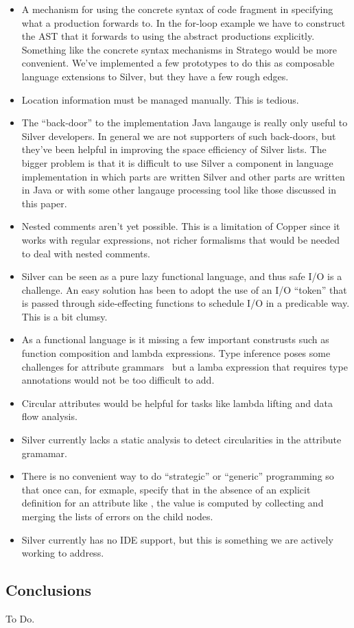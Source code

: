 \begin{itemize}
\item A mechanism for using the concrete syntax of code fragment in
  specifying what a production forwards to.  In the for-loop example
  we have to construct the AST that it forwards to using the abstract
  productions explicitly.   Something like the concrete syntax
  mechanisms in Stratego would be more convenient.   We've implemented a few
  prototypes to do this as composable language extensions to Silver,
  but they have a few rough edges.

\item Location information must be managed manually. This is tedious.
\item The ``back-door'' to the implementation Java langauge is really
  only useful to Silver developers.  In general we are not supporters
  of such back-doors, but they've been helpful in improving the space
  efficiency of Silver lists.  The bigger problem is that it is
  difficult to use Silver a component in language implementation in
  which parts are written Silver and other parts are written in Java
  or with some other langauge processing tool like those discussed in
  this paper.

\item Nested comments aren't yet possible.  This is a limitation of
  Copper since it works with regular expressions, not richer
  formalisms that would be needed to deal with nested comments.  

\item Silver can be seen as a pure lazy functional language, and thus
  safe I/O is a challenge.  An easy solution has been to adopt the use
  of an I/O ``token'' that is passed through side-effecting functions
  to schedule I/O in a predicable way.  This is a bit clumsy.

\item As a functional language is it missing a few important
  construsts such as function composition and lambda expressions.
  Type inference poses some challenges for attribute
  grammars~\cite{kaminski11sle} but a lamba expression that requires
  type annotations would not be too difficult to add.

\item Circular attributes would be helpful for tasks like lambda
  lifting and data flow analysis.
\item Silver currently lacks a static analysis to detect circularities
  in the attribute gramamar.
\item There is no convenient way to do ``strategic'' or ``generic''
  programming so that once can, for exmaple, specify that in the
  absence of an explicit definition for an attribute like
  , the value is computed by collecting and merging the
  lists of errors on the child nodes.
\item Silver currently has no IDE support, but this is something we
  are actively working to address.
\end{itemize}

\subsection{Conclusions}\label{silver:sec:conclusion}

To Do.
